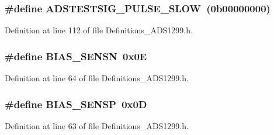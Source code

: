 \subsubsection[{\texorpdfstring{A\+D\+S\+T\+E\+S\+T\+S\+I\+G\+\_\+\+P\+U\+L\+S\+E\+\_\+\+S\+L\+OW}{ADSTESTSIG_PULSE_SLOW}}]{\setlength{\rightskip}{0pt plus 5cm}\#define A\+D\+S\+T\+E\+S\+T\+S\+I\+G\+\_\+\+P\+U\+L\+S\+E\+\_\+\+S\+L\+OW~(0b00000000)}\hypertarget{group__Definitions__ADS1299_ga6825c7210e0be635b9f9db381133900b}{}\label{group__Definitions__ADS1299_ga6825c7210e0be635b9f9db381133900b}


Definition at line 112 of file Definitions\+\_\+\+A\+D\+S1299.\+h.

\subsubsection[{\texorpdfstring{B\+I\+A\+S\+\_\+\+S\+E\+N\+SN}{BIAS_SENSN}}]{\setlength{\rightskip}{0pt plus 5cm}\#define B\+I\+A\+S\+\_\+\+S\+E\+N\+SN~0x0E}\hypertarget{group__Definitions__ADS1299_gac8197f544e39562ab0b4e67ad7d4410b}{}\label{group__Definitions__ADS1299_gac8197f544e39562ab0b4e67ad7d4410b}


Definition at line 64 of file Definitions\+\_\+\+A\+D\+S1299.\+h.

\subsubsection[{\texorpdfstring{B\+I\+A\+S\+\_\+\+S\+E\+N\+SP}{BIAS_SENSP}}]{\setlength{\rightskip}{0pt plus 5cm}\#define B\+I\+A\+S\+\_\+\+S\+E\+N\+SP~0x0D}\hypertarget{group__Definitions__ADS1299_gadee1ef2aa548da6eb85a1f103bd50471}{}\label{group__Definitions__ADS1299_gadee1ef2aa548da6eb85a1f103bd50471}


Definition at line 63 of file Definitions\+\_\+\+A\+D\+S1299.\+h.

